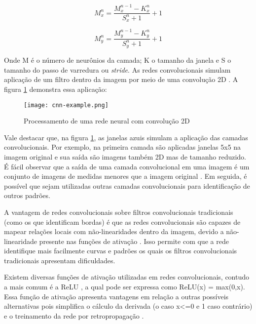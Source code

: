 \begin{equation}
    M_{x}^{n} = \frac{M_{x}^{n-1} - K_{x}^{n}}{S_{x}^{n} + 1} + 1
\end{equation}

\begin{equation}
    M_{y}^{n} = \frac{M_{y}^{n-1} - K_{y}^{n}}{S_{y}^{n} + 1} + 1
\end{equation}

Onde M é o número de neurônios da camada; K o tamanho da janela e S o tamanho do passo de varredura ou \textit{stride}. As redes convolucionais simulam aplicação de um filtro dentro da imagem por meio de uma convolução 2D \cite{behnke2003hierarchical}. A figura \ref{fig:cnn-example} demonstra essa aplicação:

\begin{figure}[h!]
    \caption{Processamento de uma rede neural com convolução 2D}
    \texttt{[image: cnn-example.png]}
    \centering
    \label{fig:cnn-example}
\end{figure}

Vale destacar que, na figura \ref{fig:cnn-example}, as janelas azuis simulam a aplicação das camadas convolucionais. Por exemplo, na primeira camada são aplicadas janelas 5x5 na imagem original e sua saída são imagens também 2D mas de tamanho reduzido. É fácil observar que a saída de uma camada convolucional em uma imagem é um conjunto de imagens de medidas menores que a imagem original \cite{cirecsan2012multi}. Em seguida, é possível que sejam  utilizadas outras camadas convolucionais para identificação de outros padrões.

A vantagem de redes convolucionais sobre filtros convolucionais tradicionais (como os que identificam bordas) é que as redes convolucionais são capazes de mapear relações locais com não-linearidades dentro da imagem, devido a não-linearidade presente nas funções de ativação \cite{leen1995data}. Isso permite com que a rede identifique mais facilmente curvas e padrões os quais os filtros convolucionais tradicionais
apresentam dificuldades.

Existem diversas funções de ativação utilizadas em redes convolucionais, contudo a mais comum é a ReLU \cite{lecun2015deep}, a qual pode ser expressa como ReLU(x) = max(0,x). Essa função de ativação apresenta vantagens em relação a outras possíveis alternativas pois simplifica o cálculo da derivada (o caso x<=0 e 1 caso contrário) e o treinamento da rede por retropropagação \cite{leen1995data}.

